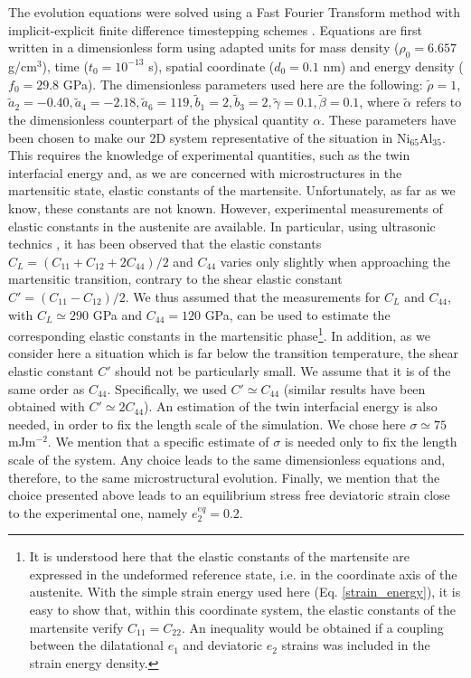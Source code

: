 \documentclass[twocolumn,amsmath,amssymb]{revtex4}
\begin{document}
The evolution equations were solved using a Fast Fourier Transform   method with implicit-explicit finite difference timestepping schemes \cite{Sal08,Mui08b,LeVeque:2007zi}. Equations are first written in a dimensionless form using adapted units for mass density ($\rho_0= 6.657$ g/cm$^3$), time ($t_0=10^{-13}$ s), spatial coordinate ($d_0=0.1$  nm) and energy density ($f_0=29.8$ GPa). The dimensionless parameters used here are the following: $\tilde \rho=1$, $\tilde a_2 = -0.40, \tilde a_4 = -2.18, \tilde a_6 = 119, \tilde b_1 = 2, \tilde b_3= 2, \tilde \gamma = 0.1, \tilde \beta = 0.1$, where $\tilde \alpha$ refers to the dimensionless counterpart of the physical quantity $\alpha$. These parameters have been chosen to make our 2D system representative of the situation in Ni$_{65}$Al$_{35}$. This requires the knowledge of experimental quantities, such as the twin interfacial energy and, as we are concerned with microstructures in the martensitic state, elastic constants of the martensite. Unfortunately, as far as we know, these constants are not known.  However, experimental measurements of elastic constants in the austenite are available. In particular, using ultrasonic technics \cite{Davenport:1999gg}, it has been observed that the elastic constants $C_L = (C_{11}+C_{12}+2C_{44})/2$ and $C_{44}$ varies only slightly when approaching the martensitic  transition, contrary to the shear elastic constant $C' = (C_{11}-C_{12})/2$. We thus assumed that the measurements for $C_L$ and $C_{44}$, with $C_L \simeq 290 $ GPa and $C_{44} = 120 $ GPa,  can be used to estimate the corresponding elastic constants in the martensitic phase\footnote{It is understood here that the elastic constants of the martensite are expressed in the undeformed reference state, i.e. in the coordinate axis of the austenite. With the simple strain energy used here (Eq. \ref{strain_energy}), it is easy to show that, within this coordinate system, the elastic constants of the martensite verify $C_{11}=C_{22}$. An inequality would be obtained if a coupling between the dilatational $e_1$ and deviatoric $e_2$ strains was included in the strain energy density.}.  In addition, as we consider here a situation which is far below the transition temperature, the shear elastic constant $C'$ should not be particularly small. We assume that it is of the same order as $C_{44}$. Specifically, we used $C'\simeq C_{44}$ (similar results have been obtained with  $C'\simeq 2C_{44}$). An estimation of the twin interfacial energy is also needed, in order to fix the length scale of the simulation. We chose here $\sigma \simeq 75$ mJm$^{-2}$. We mention that a specific estimate of $\sigma$ is needed only to fix the length scale of the system. Any choice leads to the same dimensionless equations and, therefore, to the same microstructural evolution. Finally, we mention that the choice presented above leads to an equilibrium stress free deviatoric strain close to the experimental one, namely $e_2^{eq}=0.2$.
\end{document}
